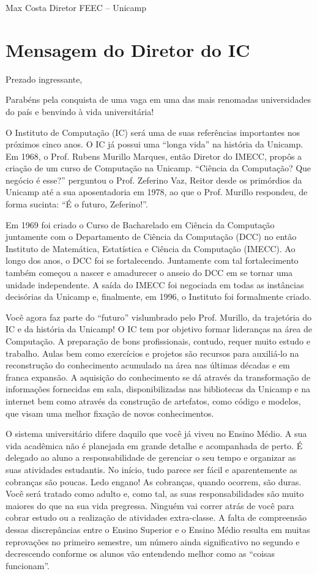 \documentclass[a4paper,10pt, twocolumn]{article}
\begin{document}
Max Costa Diretor
FEEC -- Unicamp

\section{Mensagem do Diretor do IC}
Prezado ingressante,

Parabéns pela conquista de uma vaga em uma das mais renomadas universidades do
país e benvindo à vida universitária!

O Instituto de Computação (IC) será uma de suas referências importantes nos
próximos cinco anos. O IC já possui uma “longa vida” na história da Unicamp. Em
1968, o Prof. Rubens Murillo Marques, então Diretor do IMECC, propôs a criação
de um curso de Computação na Unicamp. “Ciência da Computação? Que negócio
é esse?” perguntou o Prof. Zeferino Vaz, Reitor desde os primórdios da Unicamp
até a sua aposentadoria em 1978, ao que o Prof. Murillo respondeu, de forma
sucinta: “É o futuro, Zeferino!”.

Em 1969 foi criado o Curso de Bacharelado em Ciência da Computação juntamente
com o Departamento de Ciência da Computação (DCC) no então Instituto de
Matemática, Estatística e Ciência da Computação (IMECC). Ao longo dos anos,
o DCC foi se fortalecendo. Juntamente com tal fortalecimento também começou
a nascer e amadurecer o anseio do DCC em se tornar uma unidade independente.
A saída do IMECC foi negociada em todas as instâncias decisórias da Unicamp e,
finalmente, em 1996, o Instituto foi formalmente criado.

Você agora faz parte do “futuro” vislumbrado pelo Prof. Murillo, da trajetória
do IC e da história da Unicamp! O IC tem por objetivo formar lideranças na área
de Computação. A preparação de bons profissionais, contudo, requer muito estudo
e trabalho. Aulas bem como exercícios e projetos são recursos para auxiliá-lo na
reconstrução do conhecimento acumulado na área nas últimas décadas e em franca
expansão. A aquisição do conhecimento se dá através da transformação de
informações fornecidas em sala, disponibilizadas nas bibliotecas da Unicamp e na
internet bem como através da construção de artefatos, como código e modelos, que
visam uma melhor fixação de novos conhecimentos.

O sistema universitário difere daquilo que você já viveu no Ensino Médio. A sua
vida acadêmica não é planejada em grande detalhe e acompanhada de perto.
É delegado ao aluno a responsabilidade de gerenciar o seu tempo e organizar as
suas atividades estudantis. No início, tudo parece ser fácil e aparentemente as
cobranças são poucas. Ledo engano! As cobranças, quando ocorrem, são duras. Você
será tratado como adulto e, como tal, as suas responsabilidades são muito
maiores do que na sua vida pregressa. Ninguém vai correr atrás de você para
cobrar estudo ou a realização de atividades extra-classe. A falta de compreensão
dessas discrepâncias entre o Ensino Superior e o Ensino Médio resulta em muitas
reprovações no primeiro semestre, um número ainda significativo no segundo
e decrescendo conforme os alunos vão entendendo melhor como as “coisas
funcionam”.
\end{document}
